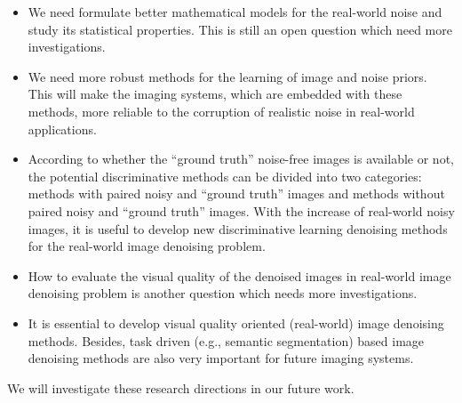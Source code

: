 \begin{itemize}
\item We need formulate better mathematical models for the real-world noise and study its statistical properties. This is still an open question which need more investigations.

\item We need more robust methods for the learning of image and noise priors. This will make the imaging systems, which are embedded with these methods, more reliable to the corruption of realistic noise in real-world applications.

\item According to whether the ``ground truth'' noise-free images is available or not, the potential discriminative methods can be divided into two categories: methods with paired noisy and ``ground truth'' images and methods without paired noisy and ``ground truth'' images. With the increase of real-world noisy images, it is useful to develop new discriminative learning denoising methods for the real-world image denoising problem. 

\item How to evaluate the visual quality of the denoised images in real-world image denoising problem is another question which needs more investigations.

\item It is essential to develop visual quality oriented (real-world) image denoising methods. Besides, task driven (e.g., semantic segmentation) based image denoising methods are also very important for future imaging systems.

\end{itemize}

We will investigate these research directions in our future work.
